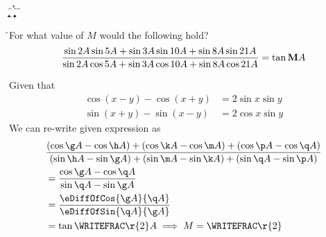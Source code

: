 

\MAX\vbone\vbtwo\a
\MIN\vbone\vbtwo\b
\MAX\vbthree\vbfour\c
\MIN\vbthree\vbfour\d
\MAX\vbfive\vbsix\e
\MIN\vbfive\vbsix\f

\SUBTRACT\a\b\g
\ADD\a\b\h
\SUBTRACT\c\d\k
\ADD\c\d\m
\SUBTRACT\e\f\p
\ADD\e\f\q

\ADD\q\g\r

\question[4] For what value of $M$ would the following hold?
\[ \dfrac{\sin2 A\sin5 A + \sin3 A\sin10 A + \sin8 A\sin21 A}
{\sin2 A\cos5 A + \sin3 A\cos10 A + \sin8 A\cos21 A} = \tan\textbf{M}A\]

\watchout

\begin{explanation}[\fullpage]
  Given that 
  \begin{align}
    \cos(x-y)-\cos(x+y) &= 2\sin x\sin y \\
    \sin(x+y) - \sin(x-y) &= 2\cos x\sin y
  \end{align}
  We can re-write given expression as 
  \begin{align}
    &\dfrac{(\cos\g A - \cos\h A) + (\cos\k A - \cos\m A) + (\cos\p A - \cos\q A)}
    {(\sin\h A - \sin\g A) + (\sin\m A - \sin\k A) + (\sin\q A - \sin\p A)} \nonumber\\
    &= \dfrac{\cos\g A - \cos\q A}{\sin\q A - \sin\g A}  \\
    &= \dfrac{\eDiffOfCos{\g A}{\q A}}{\eDiffOfSin{\q A}{\g A}} \\
    &= \tan\WRITEFRAC\r{2} A \implies M = \WRITEFRAC\r{2}
  \end{align}
\end{explanation}

